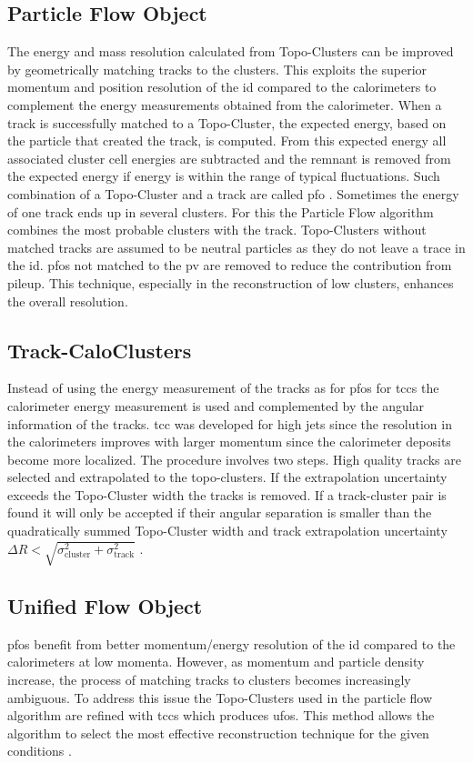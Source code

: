 \subsection{Particle Flow Object}\label{sec:particle_flow}
The energy and mass resolution calculated from Topo-Clusters can be improved by geometrically matching tracks to the clusters. This exploits the superior momentum and position resolution of the \ac{id} compared to the calorimeters to complement the energy measurements obtained from the calorimeter. When a track is successfully matched to a Topo-Cluster, the expected energy, based on the particle that created the track, is computed. From this expected energy all associated cluster cell energies are subtracted and the remnant is removed from the expected energy if energy is within the range of typical fluctuations. Such combination of a Topo-Cluster and a track are called \ac{pfo} \citep{aaboud2017jet}. Sometimes the energy of one track ends up in several clusters. For this the Particle Flow algorithm combines the most probable clusters with the track. Topo-Clusters without matched tracks are assumed to be neutral particles as they do not leave a trace in the \ac{id}. \acp{pfo} not matched to the \ac{pv} are removed to reduce the contribution from pileup.  This technique, especially in the reconstruction of low \pt clusters, enhances the overall resolution.

\subsection{Track-CaloClusters}
Instead of using the energy measurement of the tracks as for \acp{pfo} for \acp{tcc} the calorimeter energy measurement is used and complemented by the angular information of the tracks. \ac{tcc} was developed for high \pt jets since the resolution in the calorimeters improves with larger momentum since the calorimeter deposits become more localized. The procedure involves two steps. High quality tracks are selected and extrapolated to the topo-clusters. If the extrapolation uncertainty exceeds the Topo-Cluster width the tracks is removed. If a track-cluster pair is found it will only be accepted if their angular separation is smaller than the quadratically summed Topo-Cluster width and track extrapolation uncertainty $\Delta R < \sqrt{\sigma_\text{cluster}^2+\sigma_\text{track}^2}$ \citep{ATL-PHYS-PUB-2017-015}.

\subsection{Unified Flow Object}
\acp{pfo} benefit from better momentum/energy resolution of the \ac{id} compared to the calorimeters at low momenta. However, as momentum and particle density increase, the process of matching tracks to clusters becomes increasingly ambiguous. To address this issue the Topo-Clusters used in the particle flow algorithm are refined with \acp{tcc} which produces \acp{ufo}. This method allows the algorithm to select the most effective reconstruction technique for the given conditions \citep{atlas2021optimisation,ATL-PHYS-PUB-2022-038}.


